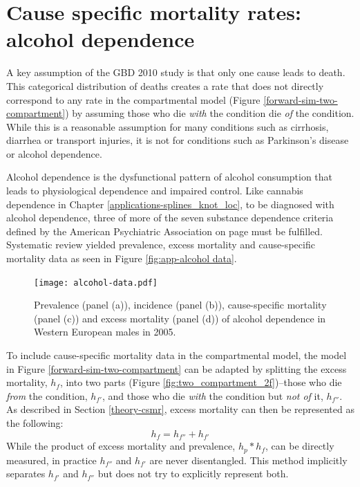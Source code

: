 \chapter{Cause specific mortality rates: alcohol dependence}
\label{applications-csmr}

A key assumption of the GBD 2010 study is that only one cause leads to
death.  This categorical distribution of deaths creates a rate that
does not directly correspond to any rate in the compartmental model
(Figure \ref{forward-sim-two-compartment}) by assuming those who die
\emph{with} the condition die \emph{of} the condition.  While this is
a reasonable assumption for many conditions such as cirrhosis,
diarrhea or transport injuries, it is not for conditions such as
Parkinson's disease or alcohol dependence.

Alcohol dependence is the dysfunctional pattern of alcohol consumption
that leads to physiological dependence and impaired control.  Like
cannabis dependence in Chapter \ref{applications-splines_knot_loc}, to
be diagnosed with alcohol dependence, three of more of the seven
substance dependence criteria defined by the American Psychiatric
Association on page \pageref{page:app-substance_dependence} must be
fulfilled. \cite{american_diagnostic_2000, hasin_prevalence_2007}
Systematic review yielded prevalence, excess mortality and
cause-specific mortality data as seen in Figure \ref{fig:app-alcohol
  data}.

    \begin{figure}[h]
        \begin{center}
            \texttt{[image: alcohol-data.pdf]}
            \caption{Prevalence (panel (a)), incidence (panel (b)),
              cause-specific mortality (panel (c)) and excess
              mortality (panel (d)) of alcohol dependence in Western
              European males in 2005.}
            \label{fig:app-alcohol data}
        \end{center}
    \end{figure}

To include cause-specific mortality data in the compartmental model,
the model in Figure \ref{forward-sim-two-compartment} can be adapted
by splitting the excess mortality, $h_{f}$, into two parts (Figure
\ref{fig:two_compartment_2f})--those who die \emph{from} the
condition, $h_{f'}$, and those who die \emph{with} the condition but
\emph{not of} it, $h_{f''}$.  As described in Section
\ref{theory-csmr}, excess mortality can then be represented as the
following:
    \begin{equation}
        h_{f} = h_{f''} + h_{f'}
    \end{equation}
While the product of excess mortality and prevalence, $h_{p}*h_{f}$,
can be directly measured, in practice $h_{f''}$ and $h_{f'}$ are never
disentangled.  This method implicitly separates $h_{f'}$ and $h_{f''}$
but does not try to explicitly represent both.

